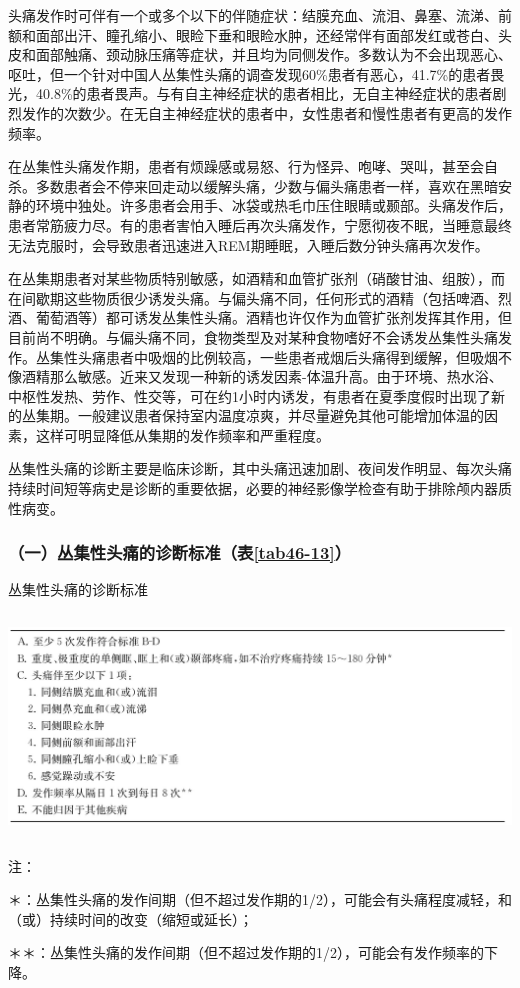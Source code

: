 头痛发作时可伴有一个或多个以下的伴随症状：结膜充血、流泪、鼻塞、流涕、前额和面部出汗、瞳孔缩小、眼睑下垂和眼睑水肿，还经常伴有面部发红或苍白、头皮和面部触痛、颈动脉压痛等症状，并且均为同侧发作。多数认为不会出现恶心、呕吐，但一个针对中国人丛集性头痛的调查发现60\%患者有恶心，41.7\%的患者畏光，40.8\%的患者畏声。与有自主神经症状的患者相比，无自主神经症状的患者剧烈发作的次数少。在无自主神经症状的患者中，女性患者和慢性患者有更高的发作频率。

在丛集性头痛发作期，患者有烦躁感或易怒、行为怪异、咆哮、哭叫，甚至会自杀。多数患者会不停来回走动以缓解头痛，少数与偏头痛患者一样，喜欢在黑暗安静的环境中独处。许多患者会用手、冰袋或热毛巾压住眼睛或颞部。头痛发作后，患者常筋疲力尽。有的患者害怕入睡后再次头痛发作，宁愿彻夜不眠，当睡意最终无法克服时，会导致患者迅速进入REM期睡眠，入睡后数分钟头痛再次发作。

在丛集期患者对某些物质特别敏感，如酒精和血管扩张剂（硝酸甘油、组胺），而在间歇期这些物质很少诱发头痛。与偏头痛不同，任何形式的酒精（包括啤酒、烈酒、葡萄酒等）都可诱发丛集性头痛。酒精也许仅作为血管扩张剂发挥其作用，但目前尚不明确。与偏头痛不同，食物类型及对某种食物嗜好不会诱发丛集性头痛发作。丛集性头痛患者中吸烟的比例较高，一些患者戒烟后头痛得到缓解，但吸烟不像酒精那么敏感。近来又发现一种新的诱发因素-体温升高。由于环境、热水浴、中枢性发热、劳作、性交等，可在约1小时内诱发，有患者在夏季度假时出现了新的丛集期。一般建议患者保持室内温度凉爽，并尽量避免其他可能增加体温的因素，这样可明显降低从集期的发作频率和严重程度。

丛集性头痛的诊断主要是临床诊断，其中头痛迅速加剧、夜间发作明显、每次头痛持续时间短等病史是诊断的重要依据，必要的神经影像学检查有助于排除颅内器质性病变。

\subsubsection{（一）丛集性头痛的诊断标准（表\ref{tab46-13}）}

\begin{table}[htbp]
\begin{centering}
\caption{丛集性头痛的诊断标准}
\label{tab46-13}
\includegraphics[width=5.9375in,height=2.33333in]{./images/Image00290.jpg}
\end{centering}

{\small 注：

＊：丛集性头痛的发作间期（但不超过发作期的1/2），可能会有头痛程度减轻，和（或）持续时间的改变（缩短或延长）；

＊＊：丛集性头痛的发作间期（但不超过发作期的1/2），可能会有发作频率的下降。}
\end{table}



